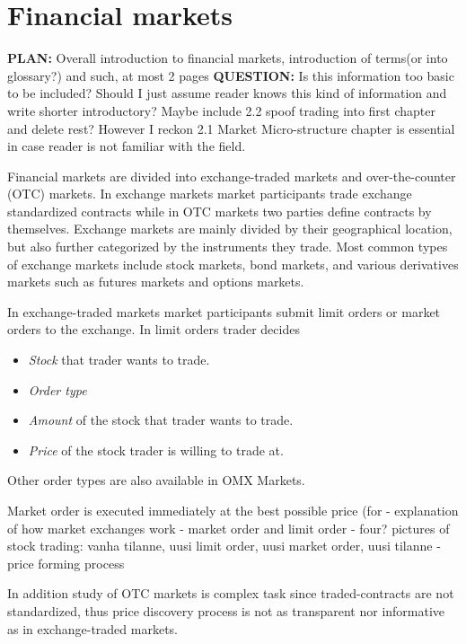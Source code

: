 \documentclass{tut-thesis}
\begin{document}
\chapter{Financial markets}
\textbf{PLAN:} Overall introduction to financial markets, introduction of terms(or into glossary?) and such, at most 2 pages
\textbf{QUESTION:} Is this information too basic to be included? Should I just assume reader knows this kind of information and write shorter introductory? Maybe include 2.2 spoof trading into first chapter and delete rest? However I reckon 2.1 Market Micro-structure chapter is essential in case reader is not familiar with the field.
 

Financial markets are divided into exchange-traded markets and over-the-counter (OTC) markets. In exchange markets market participants trade exchange standardized contracts while in OTC markets two parties define contracts by themselves. \autocite{Hull2017} Exchange markets are mainly divided by their geographical location, but also further categorized by the instruments they trade. Most common types of exchange markets include stock markets, bond markets, and various derivatives markets such as futures markets and options markets.

In exchange-traded markets market participants submit limit orders or market orders to the exchange. In limit orders trader decides 

\begin{itemize}
	\item \textit{Stock} that trader wants to trade.
	\item \textit{Order type} 
	\item \textit{Amount} of the stock that trader wants to trade.
	\item \textit{Price} of the stock trader is willing to trade at.
\end{itemize}

Other order types are also available in OMX Markets. 

Market order is executed immediately at the best possible price (for 
- explanation of how market exchanges work
- market order and limit order
- four? pictures of stock trading: vanha tilanne, uusi limit order, uusi market order, uusi tilanne 
- price forming process

In addition study of OTC markets is complex task since traded-contracts are not standardized, thus price discovery process is not as transparent nor informative as in exchange-traded markets.
\end{document}
